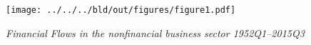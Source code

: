\begin{figure}[h]
  \centering
  \texttt{[image: ../../../bld/out/figures/figure1.pdf]}
  \caption{\textit{Financial Flows in the nonfinancial business sector 1952Q1--2015Q3}}
  \label{fig:figure1_update}
\end{figure}